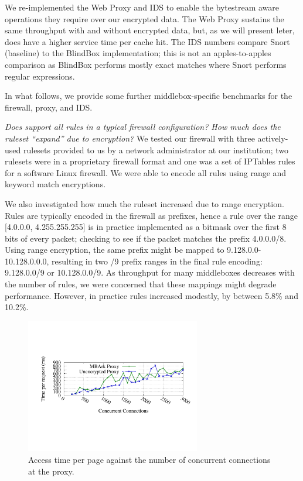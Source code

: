 We re-implemented the Web Proxy and IDS to enable the bytestream aware operations they require over our encrypted data. The Web Proxy sustains the same throughput with and without encrypted data, but, as we will present leter, does have a higher service time per cache hit.
The IDS numbers compare Snort (baseline) to the BlindBox implementation; this is not an apples-to-apples comparison as BlindBox performs mostly exact matches where Snort performs regular expressions.

In what follows, we provide some further middlebox-specific benchmarks for the firewall, proxy, and IDS.

{\it Does \sys support all rules in a typical firewall configuration? How much does the ruleset ``expand'' due to encryption?}
We tested our firewall with three actively-used rulesets provided to us by a network administrator at our institution; two rulesets were in a proprietary firewall format and one was a set of IPTables rules for a software Linux firewall.
We were able to encode all rules using range and keyword match encryptions.

We also investigated how much the ruleset increased due to range encryption. Rules are typically encoded in the firewall as prefixes, hence a rule over the range [4.0.0.0, 4.255.255.255] is in practice implemented as a bitmask over the first 8 bits of every packet; checking to see if the packet matches the prefix 4.0.0.0/8.
Using range encryption, the same prefix might be mapped to 9.128.0.0-10.128.0.0.0, resulting in two /9 prefix ranges in the final rule encoding: 9.128.0.0/9 or 10.128.0.0/9.
As throughput for many middleboxes decreases with the number of rules, we were concerned that these mappings might degrade performance. However, in practice rules increased modestly, by between 5.8\% and 10.2\%.

\begin{figure}[t]
\centering
\includegraphics[width=3in]{fig/proxytime}
\caption{\label{fig:proxygraph} Access time per page against the number of concurrent connections at the proxy.}
\end{figure}

